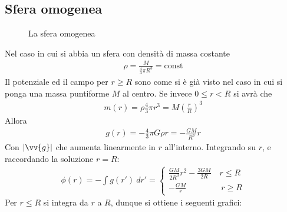 \documentclass[a4paper, oneside]{book}
\begin{document}
\subsection{Sfera omogenea}
\begin{figure}
    \centering
    \caption{La sfera omogenea}
\end{figure}
Nel caso in cui si abbia un sfera con densità di massa costante
\begin{gather*}
    \rho = \frac{M}{\frac{4}{3}\pi R^{3}} = \text{const}
\end{gather*}
Il potenziale ed il campo per $r \geq R$ sono come si è già visto 
nel caso in cui si ponga una massa puntiforme $M$ al centro. Se invece 
$0 \leq r < R$ si avrà che
\begin{gather*}
    m(r) = \rho \frac{4}{3}\pi r^{3} = M\left(\frac{r}{R}\right)^{3}
\end{gather*}
Allora 
\begin{align}
    g(r) = -\frac{4}{3}\pi G\rho r = - \frac{GM}{R^{3}}r
\end{align}
Con $\left| \vv{g}  \right|$ che aumenta linearmente in $r$ all'interno.
Integrando su $r$, e raccordando la soluzione $r = R$:
\begin{align}
    \phi(r) = - \int g(r') \ dr' = \left\{\begin{array}{l}
        \displaystyle \frac{GM}{2R^{3}}r^{2} - \frac{3GM}{2R} \quad r \leq R \\
        \displaystyle - \frac{GM}{r} \qquad \qquad \  r \geq R
    \end{array}\right. 
\end{align}  
Per $r \leq R$ si integra da $r$ a $R$, dunque si ottiene i seguenti grafici:
\end{document}
